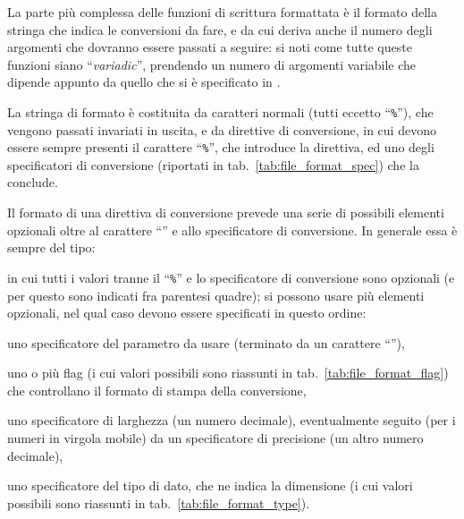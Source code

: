 La parte più complessa delle funzioni di scrittura formattata è il formato
della stringa  che indica le conversioni da fare, e da cui
deriva anche il numero degli argomenti che dovranno essere passati a seguire:
si noti come tutte queste funzioni siano ``\textit{variadic}'', prendendo un
numero di argomenti variabile che dipende appunto da quello che si è
specificato in .

La stringa di formato è costituita da caratteri normali (tutti eccetto
``\texttt{\%}''), che vengono passati invariati in uscita, e da direttive di
conversione, in cui devono essere sempre presenti il carattere
``\texttt{\%}'', che introduce la direttiva, ed uno degli specificatori di
conversione (riportati in tab.~\ref{tab:file_format_spec}) che la conclude.

Il formato di una direttiva di conversione prevede una serie di possibili
elementi opzionali oltre al carattere ``\cmd{\%}'' e allo specificatore di
conversione. In generale essa è sempre del tipo:
\begin{Example}
\end{Example}
in cui tutti i valori tranne il ``\texttt{\%}'' e lo specificatore di
conversione sono opzionali (e per questo sono indicati fra parentesi quadre);
si possono usare più elementi opzionali, nel qual caso devono essere
specificati in questo ordine:
\begin{itemize*}
\item uno specificatore del parametro da usare (terminato da un carattere
  ``\val{\$}''),
\item uno o più flag (i cui valori possibili sono riassunti in
  tab.~\ref{tab:file_format_flag}) che controllano il formato di stampa della
  conversione,
\item uno specificatore di larghezza (un numero decimale), eventualmente
  seguito (per i numeri in virgola mobile) da un specificatore di precisione
  (un altro numero decimale),
\item uno specificatore del tipo di dato, che ne indica la dimensione (i cui
  valori possibili sono riassunti in tab.~\ref{tab:file_format_type}).
\end{itemize*}

